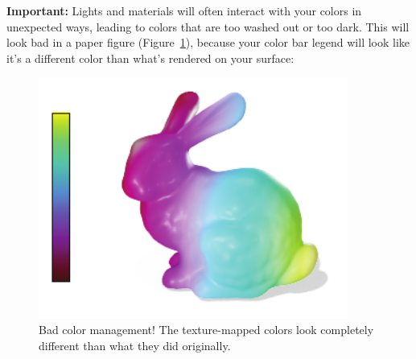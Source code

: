 \documentclass[10pt]{article}
\begin{document}

{\bf Important:} Lights and materials will often interact with your colors in unexpected ways, leading to colors that are too washed out or too dark. This will look bad in a paper figure (Figure~\ref{fig:bad-color-management}), because your color bar legend will look like it's a different color than what's rendered on your surface:
\begin{figure}[H]
    \centering
    \includegraphics[width=4in]{images/bad-color-management.pdf}
    \caption{Bad color management! The texture-mapped colors look completely different than what they did originally.}
    \label{fig:bad-color-management}
\end{figure}
\end{document}
